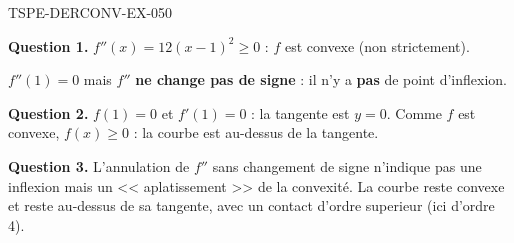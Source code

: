 \begin{corrige}{TSPE-DERCONV-EX-050}

\textbf{Question 1.} $f''(x) = 12(x-1)^2 \geq 0$ : $f$ est convexe (non strictement).


$f''(1) = 0$ mais $f''$ \textbf{ne change pas de signe} : il n'y a \textbf{pas} de point d'inflexion.

\textbf{Question 2.} $f(1) = 0$ et $f'(1) = 0$ : la tangente est $y = 0$. Comme $f$ est convexe, $f(x) \geq 0$ : la courbe est au-dessus de la tangente.

\textbf{Question 3.} L'annulation de $f''$ sans changement de signe n'indique pas une inflexion mais un << aplatissement >> de la convexité. La courbe reste convexe et reste au-dessus de sa tangente, avec un contact d'ordre superieur (ici d'ordre 4).

\end{corrige}
